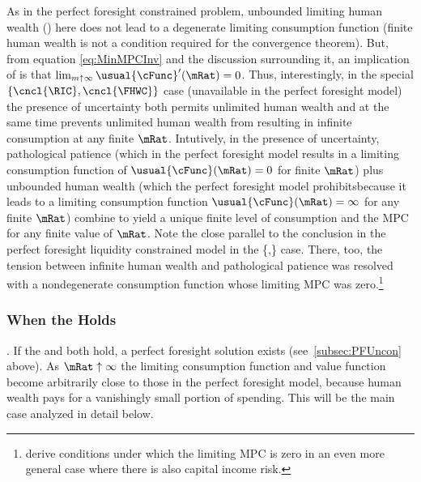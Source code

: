 \documentclass[BufferStockTheory]{subfiles}
\begin{document}
As in the perfect foresight constrained problem, unbounded limiting human wealth (\cncl{\FHWC}) here does not lead to a degenerate limiting consumption function (finite human wealth is not a condition required for the convergence theorem).  But, from equation \eqref{eq:MinMPCInv} and the discussion surrounding it, an implication of \cncl{\RIC} is that $\lim_{m \uparrow \infty} \usual{\cFunc}^{\prime}(\mRat) = 0$.  Thus, interestingly, in the special $\{\cncl{\RIC},\cncl{\FHWC}\}$ case (unavailable in the perfect foresight model) the presence of uncertainty both permits unlimited human wealth and at the same time prevents unlimited human wealth from resulting in infinite consumption at any finite $\mRat$.  Intutively, in the presence of uncertainty, pathological patience (which in the perfect foresight model results in a limiting consumption function of $\usual{\cFunc}(\mRat)=0$ for finite $\mRat$) plus unbounded human wealth (which the perfect foresight model prohibitsbecause it leads to a limiting consumption function $\usual{\cFunc}(\mRat)=\infty$ for any finite $\mRat$) combine to yield a unique finite level of consumption and the MPC for any finite value of $\mRat$.  Note the close parallel to the conclusion in the perfect foresight liquidity constrained model in the \{\GICRaw,\cncl{\RIC}\} case.  There, too, the tension between infinite human wealth and pathological patience was resolved with a nondegenerate consumption function whose limiting MPC was zero.\footnote{\cite{maTodaRich} derive conditions under which the limiting MPC is zero in an even more general case where there is also capital income risk.}

\hypertarget{When-the-RIC-Holds}{}
\subsubsection{When the {\RIC} Holds}\label{subsubsec:WhenTheGICNrmFails}  \label{subsubsec:WhenTheRICHolds} 

\indent \textbf{\FHWC}.  If the {\RIC} and {\FHWC} both hold, a perfect foresight solution exists (see~\ref{subsec:PFUncon} above).  As $\mRat \uparrow \infty$ the limiting consumption function and value function become arbitrarily close to those in the perfect foresight model, because human wealth pays for a vanishingly small portion of spending.  This will be the main case analyzed in detail below.
\end{document}
